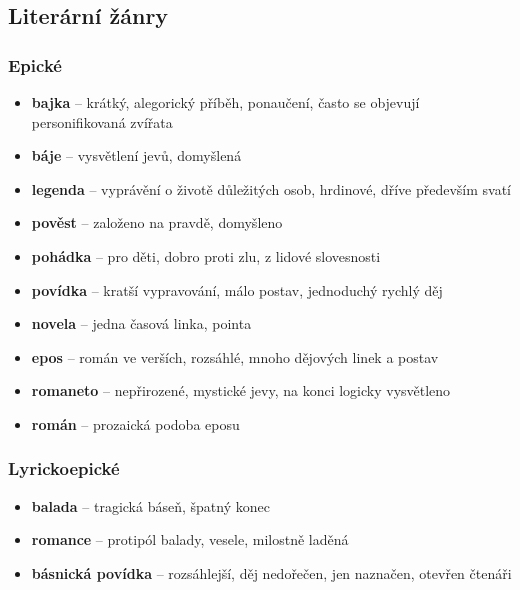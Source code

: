 \subsection{Literární žánry}
\subsubsection{Epické}
\begin{itemize}
\item[] \textbf{bajka} -- krátký, alegorický příběh, ponaučení, často se objevují personifikovaná zvířata
\item[] \textbf{báje} -- vysvětlení jevů, domyšlená
\item[] \textbf{legenda} -- vyprávění o životě důležitých osob, hrdinové, dříve především svatí
\item[] \textbf{pověst} -- založeno na pravdě, domyšleno
\item[] \textbf{pohádka} -- pro děti, dobro proti zlu, z lidové slovesnosti
\item[] \textbf{povídka} -- kratší vypravování, málo postav, jednoduchý rychlý děj
\item[] \textbf{novela} -- jedna časová linka, pointa
\item[] \textbf{epos} -- román ve verších, rozsáhlé, mnoho dějových linek a postav
\item[] \textbf{romaneto} -- nepřirozené, mystické jevy, na konci logicky vysvětleno
\item[] \textbf{román} -- prozaická podoba eposu
\end{itemize}

\subsubsection{Lyrickoepické}
\begin{itemize}
\item[] \textbf{balada} -- tragická báseň, špatný konec
\item[] \textbf{romance} -- protipól balady, vesele, milostně laděná
\item[] \textbf{básnická povídka} -- rozsáhlejší, děj nedořečen, jen naznačen, otevřen čtenáři
\end{itemize}

